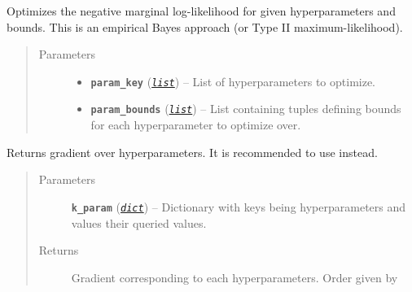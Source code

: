 \documentclass[letterpaper,10pt,english]{sphinxmanual}
\begin{document}
\begin{fulllineitems}
\begin{fulllineitems}
\label{pyGPGO.surrogates.GaussianProcess:pyGPGO.surrogates.GaussianProcess.GaussianProcess.optHyp}
Optimizes the negative marginal log-likelihood for given hyperparameters and bounds.
This is an empirical Bayes approach (or Type II maximum-likelihood).
\begin{quote}\begin{description}
\item[{Parameters}] \leavevmode\begin{itemize}
\item {} 
\textbf{\texttt{param\_key}} (\href{https://docs.python.org/2/library/functions.html\#list}{\emph{\texttt{list}}}) -- List of hyperparameters to optimize.

\item {} 
\textbf{\texttt{param\_bounds}} (\href{https://docs.python.org/2/library/functions.html\#list}{\emph{\texttt{list}}}) -- List containing tuples defining bounds for each hyperparameter to optimize over.

\end{itemize}

\end{description}\end{quote}

\end{fulllineitems}


\begin{fulllineitems}
\label{pyGPGO.surrogates.GaussianProcess:pyGPGO.surrogates.GaussianProcess.GaussianProcess.param_grad}
Returns gradient over hyperparameters. It is recommended to use  instead.
\begin{quote}\begin{description}
\item[{Parameters}] \leavevmode
\textbf{\texttt{k\_param}} (\href{https://docs.python.org/2/library/stdtypes.html\#dict}{\emph{\texttt{dict}}}) -- Dictionary with keys being hyperparameters and values their queried values.

\item[{Returns}] \leavevmode
Gradient corresponding to each hyperparameters. Order given by 


\end{description}
\end{quote}
\end{fulllineitems}
\end{fulllineitems}
\end{document}
